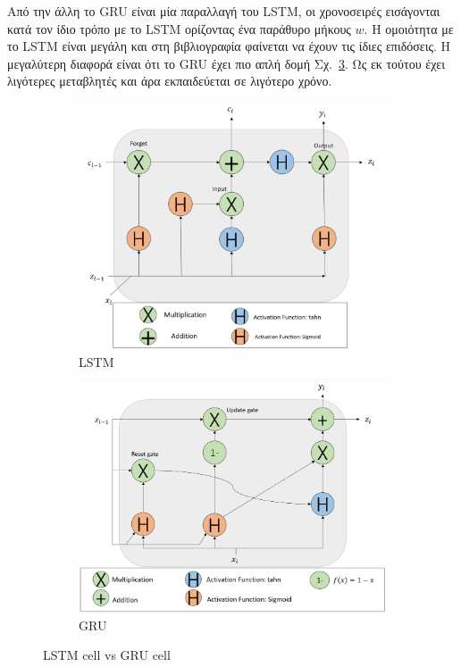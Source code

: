 \documentclass[a4paper,12pt]{report}
\theoremstyle{definitionNODot}
\begin{document}
\begin{itemize}
		Από την άλλη το GRU είναι μία παραλλαγή του LSTM, οι χρονοσειρές εισάγονται κατά τον ίδιο τρόπο με το LSTM ορίζοντας ένα παράθυρο μήκους $w$. Η ομοιότητα με το LSTM είναι μεγάλη και στη βιβλιογραφία φαίνεται να έχουν τις ίδιες επιδόσεις. Η μεγαλύτερη διαφορά είναι ότι το GRU έχει πιο απλή δομή Σχ.~\ref{fig:lstmgrucomparison}. Ως εκ τούτου έχει λιγότερες μεταβλητές και άρα εκπαιδεύεται σε λιγότερο χρόνο.
		
		\begin{figure}[h]
			\centering
			\begin{subfigure}[b]{0.8\textwidth}
				\centering
				\includegraphics[width=\textwidth]{lstmarchitecture2.png}
				\caption{LSTM}
				\label{fig:lstmarchitecturecell}
			\end{subfigure}
			\hfill
			\begin{subfigure}[b]{0.8\textwidth}
				\centering
				\includegraphics[width=\textwidth]{gruarchitecture2.png}
				\caption{GRU}
				\label{fig:gruarchitecturecell}
			\end{subfigure}
			\caption{LSTM cell vs GRU cell}
			\label{fig:lstmgrucomparison}
		\end{figure}
		
	\end{itemize}
	
\end{document}
